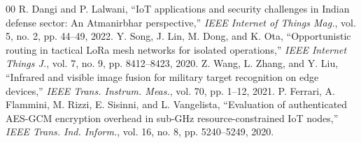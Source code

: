 \documentclass[conference]{IEEEtran}
\begin{document}
\begin{thebibliography}{00}
 R. Dangi and P. Lalwani, ``IoT applications and security challenges in Indian defense sector: An Atmanirbhar perspective,'' \textit{IEEE Internet of Things Mag.}, vol. 5, no. 2, pp. 44--49, 2022.
 Y. Song, J. Lin, M. Dong, and K. Ota, ``Opportunistic routing in tactical LoRa mesh networks for isolated operations,'' \textit{IEEE Internet Things J.}, vol. 7, no. 9, pp. 8412--8423, 2020.
 Z. Wang, L. Zhang, and Y. Liu, ``Infrared and visible image fusion for military target recognition on edge devices,'' \textit{IEEE Trans. Instrum. Meas.}, vol. 70, pp. 1--12, 2021.
 P. Ferrari, A. Flammini, M. Rizzi, E. Sisinni, and L. Vangelista, ``Evaluation of authenticated AES-GCM encryption overhead in sub-GHz resource-constrained IoT nodes,'' \textit{IEEE Trans. Ind. Inform.}, vol. 16, no. 8, pp. 5240--5249, 2020.
\end{thebibliography}
\end{document}
